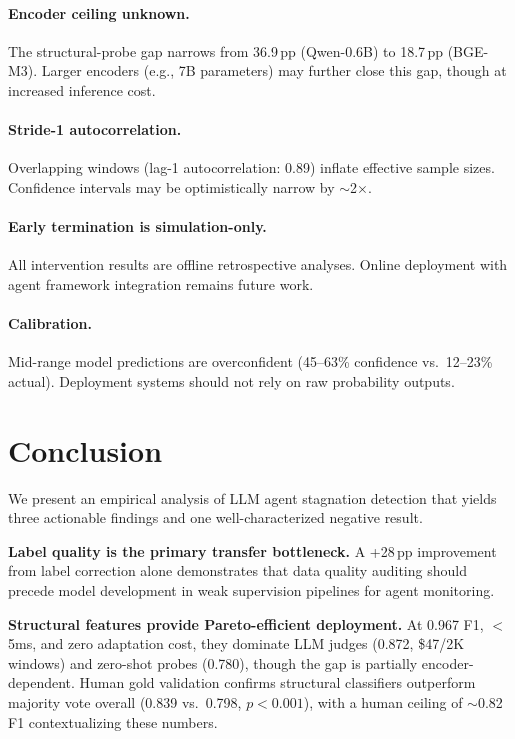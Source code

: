 \documentclass[11pt,a4paper]{article}
\begin{document}
\paragraph{Encoder ceiling unknown.}
The structural-probe gap narrows from 36.9\,pp (Qwen-0.6B) to 18.7\,pp (BGE-M3).
Larger encoders (e.g., 7B parameters) may further close this gap, though at increased inference cost.

\paragraph{Stride-1 autocorrelation.}
Overlapping windows (lag-1 autocorrelation: 0.89) inflate effective sample sizes.
Confidence intervals may be optimistically narrow by $\sim$2$\times$.

\paragraph{Early termination is simulation-only.}
All intervention results are offline retrospective analyses.
Online deployment with agent framework integration remains future work.

\paragraph{Calibration.}
Mid-range model predictions are overconfident (45--63\% confidence vs.\ 12--23\% actual).
Deployment systems should not rely on raw probability outputs.

\section{Conclusion}

We present an empirical analysis of LLM agent stagnation detection that yields three actionable findings and one well-characterized negative result.

\textbf{Label quality is the primary transfer bottleneck.} A +28\,pp improvement from label correction alone demonstrates that data quality auditing should precede model development in weak supervision pipelines for agent monitoring.

\textbf{Structural features provide Pareto-efficient deployment.} At 0.967 F1, $<$5ms, and zero adaptation cost, they dominate LLM judges (0.872, \$47/2K windows) and zero-shot probes (0.780), though the gap is partially encoder-dependent.
Human gold validation confirms structural classifiers outperform majority vote overall (0.839 vs.\ 0.798, $p<0.001$), with a human ceiling of $\sim$0.82 F1 contextualizing these numbers.
\end{document}
